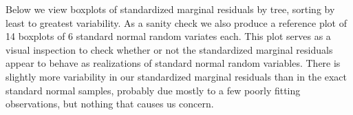 \documentclass[
]{book}
\newenvironment{Shaded}{\begin{snugshade}}{\end{snugshade}}
\newcommand{\ConstantTok}[1]{\textcolor[rgb]{0.00,0.00,0.00}{#1}}
\newcommand{\ControlFlowTok}[1]{\textcolor[rgb]{0.13,0.29,0.53}{\textbf{#1}}}
\newcommand{\DecValTok}[1]{\textcolor[rgb]{0.00,0.00,0.81}{#1}}
\newcommand{\FunctionTok}[1]{\textcolor[rgb]{0.00,0.00,0.00}{#1}}
\newcommand{\NormalTok}[1]{#1}
\newcommand{\OtherTok}[1]{\textcolor[rgb]{0.56,0.35,0.01}{#1}}
\newcommand{\SpecialCharTok}[1]{\textcolor[rgb]{0.00,0.00,0.00}{#1}}
\begin{document}
\begin{Shaded}
\end{Shaded}

Below we view boxplots of standardized marginal residuals by tree, sorting by least to greatest variability. As a sanity check we also produce a reference plot of 14 boxplots of 6 standard normal random variates each. This plot serves as a visual inspection to check whether or not the standardized marginal residuals appear to behave as realizations of standard normal random variables. There is slightly more variability in our standardized marginal residuals than in the exact standard normal samples, probably due mostly to a few poorly fitting observations, but nothing that causes us concern.
\end{document}
